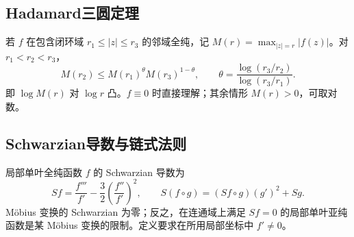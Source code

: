 \documentclass[../main.tex]{subfiles}
\begin{document}
\subsection{Hadamard三圆定理}
若 $f$ 在包含闭环域 $r_1\le|z|\le r_3$ 的邻域全纯，记 $M(r)=\max_{|z|=r}|f(z)|$。对 $r_1<r_2<r_3$，
\[
M(r_2)\le M(r_1)^\theta M(r_3)^{1-\theta},\qquad
\theta=\frac{\log(r_3/r_2)}{\log(r_3/r_1)}.
\]
即 $\log M(r)$ 对 $\log r$ 凸。$f\equiv0$ 时直接理解；其余情形 $M(r)>0$，可取对数。
\subsection{Schwarzian导数与链式法则}
局部单叶全纯函数 $f$ 的 Schwarzian 导数为
\[
Sf=\frac{f'''}{f'}-\frac32\left(\frac{f''}{f'}\right)^2,\qquad
S(f\circ g)=(Sf\circ g)(g')^2+Sg.
\]
Möbius 变换的 Schwarzian 为零；反之，在连通域上满足 $Sf=0$ 的局部单叶亚纯函数是某 Möbius 变换的限制。定义要求在所用局部坐标中 $f'\ne0$。
\clearpage
\end{document}
